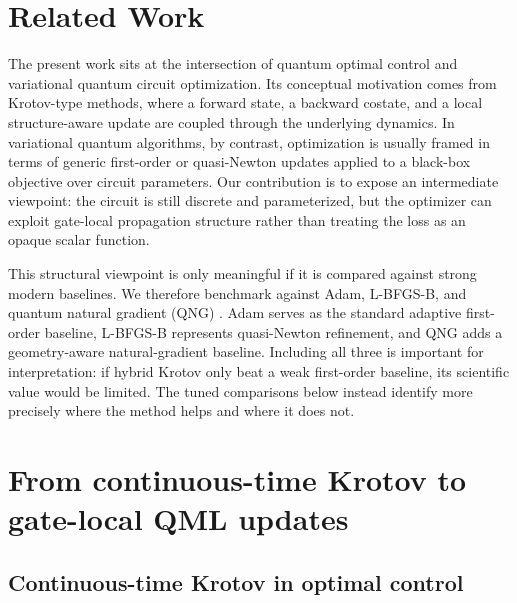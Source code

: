 \documentclass[aps,prb,10pt,twocolumn,superscriptaddress]{revtex4-2}
\begin{document}
\section{Related Work}

The present work sits at the intersection of quantum optimal control and variational quantum circuit optimization. Its conceptual motivation comes from Krotov-type methods, where a forward state, a backward costate, and a local structure-aware update are coupled through the underlying dynamics. In variational quantum algorithms, by contrast, optimization is usually framed in terms of generic first-order or quasi-Newton updates applied to a black-box objective over circuit parameters. Our contribution is to expose an intermediate viewpoint: the circuit is still discrete and parameterized, but the optimizer can exploit gate-local propagation structure rather than treating the loss as an opaque scalar function.

This structural viewpoint is only meaningful if it is compared against strong modern baselines. We therefore benchmark against Adam, L-BFGS-B, and quantum natural gradient (QNG) \cite{StokesEtAl2020QNG}. Adam serves as the standard adaptive first-order baseline, L-BFGS-B represents quasi-Newton refinement, and QNG adds a geometry-aware natural-gradient baseline. Including all three is important for interpretation: if hybrid Krotov only beat a weak first-order baseline, its scientific value would be limited. The tuned comparisons below instead identify more precisely where the method helps and where it does not.

\section{From continuous-time Krotov to gate-local QML updates}

\subsection{Continuous-time Krotov in optimal control}
\end{document}
